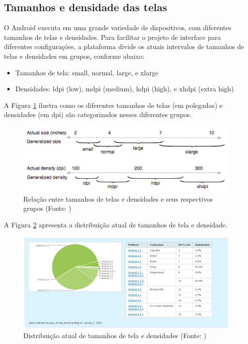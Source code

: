 \subsection{Tamanhos e densidade das telas}

O Android executa em uma grande variedade de dispositivos, com diferentes tamanhos
 de telas e densidades. Para facilitar o projeto de interface para diferentes 
 configurações, a plataforma divide os atuais intervalos de tamanhos de telas e
 densidades em grupos, conforme abaixo:
\begin{itemize}
    \item Tamanhos de tela: small, normal, large, e xlarge
    \item Densidades: ldpi (low), mdpi (medium), hdpi (high), e xhdpi (extra high)
\end{itemize}
 
A Figura \ref{intervalos_telas} ilustra como os diferentes tamanhos de telas 
(em polegadas) e 
densidades (em dpi) são categorizados nesses diferentes grupos.

\begin{figure}[h]
    \centering
    \includegraphics[width=15cm]{img/intervalos_telas}
    \caption{Relação entre tamanhos de telas e densidades e seus respectivos grupos 
        (Fonte: \cite{sup_multi_screens}) }
    \label{intervalos_telas}
\end{figure}

A Figura \ref{distribuicao_telas} apresenta a distribuição atual de tamanhos 
de tela e densidade.

\begin{figure}[h]
    \centering
    \includegraphics[width=15cm]{img/api_level}
    \caption{Distribuição atual de tamanhos de tela e densidades (Fonte: \cite{sup_multi_screens})}
    \label{distribuicao_telas}
\end{figure}


